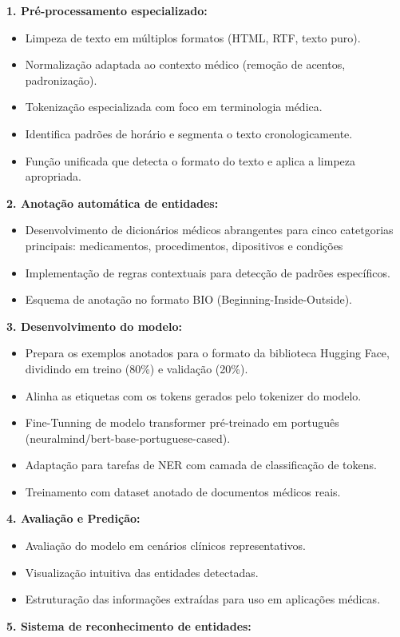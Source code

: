 \documentclass{article}
\begin{document}
\noindent \textbf{1. Pré-processamento especializado:}
\begin{itemize}
    \item Limpeza de texto em múltiplos formatos (HTML, RTF, texto puro).
    \item Normalização adaptada ao contexto médico (remoção de acentos, padronização).
    \item Tokenização especializada com foco em terminologia médica. 
    \item Identifica padrões de horário e segmenta o texto cronologicamente.
    \item Função unificada que detecta o formato do texto e aplica a limpeza apropriada.
\end{itemize}

\noindent \textbf{2. Anotação automática de entidades:}
\begin{itemize}
    \item Desenvolvimento de dicionários médicos abrangentes para cinco catetgorias principais: medicamentos, procedimentos, dipositivos e condições
    \item Implementação de regras contextuais para detecção de padrões específicos.
    \item Esquema de anotação no formato BIO (Beginning-Inside-Outside).
\end{itemize}

\noindent \textbf{3. Desenvolvimento do modelo:}
\begin{itemize}
    \item Prepara os exemplos anotados para o formato da biblioteca Hugging Face, dividindo em treino (80\%) e validação (20\%).
    \item Alinha as etiquetas com os tokens gerados pelo tokenizer do modelo.
    \item Fine-Tunning de modelo transformer pré-treinado em português (neuralmind/bert-base-portuguese-cased).
    \item Adaptação para tarefas de NER com camada de classificação de tokens.
    \item Treinamento com dataset anotado de documentos médicos reais.
\end{itemize}

\noindent \textbf{4. Avaliação e Predição:}
\begin{itemize}
    \item Avaliação do modelo em cenários clínicos representativos.
    \item Visualização intuitiva das entidades detectadas.
    \item Estruturação das informações extraídas para uso em aplicações médicas.
\end{itemize}
\textbf{5. Sistema de reconhecimento de entidades: }
\end{document}

